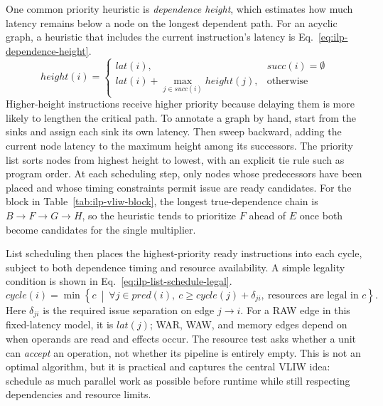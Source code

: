 One common priority heuristic is \textit{dependence height}, which estimates how much latency remains below a node on the longest dependent path.
For an acyclic graph, a heuristic that includes the current instruction's latency is Eq.~\eqref{eq:ilp-dependence-height}.
\begin{equation}\label{eq:ilp-dependence-height}
    height(i)=
    \begin{cases}
        lat(i), & succ(i)=\emptyset\\
        lat(i)+\max\limits_{j\in succ(i)} height(j), & \text{otherwise}
    \end{cases}
\end{equation}
Higher-height instructions receive higher priority because delaying them is more likely to lengthen the critical path.
To annotate a graph by hand, start from the sinks and assign each sink its own latency.
Then sweep backward, adding the current node latency to the maximum height among its successors.
The priority list sorts nodes from highest height to lowest, with an explicit tie rule such as program order.
At each scheduling step, only nodes whose predecessors have been placed and whose timing constraints permit issue are ready candidates.
For the block in Table~\ref{tab:ilp-vliw-block}, the longest true-dependence chain is $B\rightarrow F\rightarrow G\rightarrow H$, so the heuristic tends to prioritize $F$ ahead of $E$ once both become candidates for the single multiplier.

List scheduling then places the highest-priority ready instructions into each cycle, subject to both dependence timing and resource availability.
A simple legality condition is shown in Eq.~\eqref{eq:ilp-list-schedule-legal}.
\begin{equation}\label{eq:ilp-list-schedule-legal}
    cycle(i)=\min\!\left\{c\ \middle|\ \forall j\in pred(i),\ c\ge cycle(j)+\delta_{ji},\ \text{resources are legal in }c \right\}.
\end{equation}
Here $\delta_{ji}$ is the required issue separation on edge $j\rightarrow i$.
For a RAW edge in this fixed-latency model, it is $lat(j)$; WAR, WAW, and memory edges depend on when operands are read and effects occur.
The resource test asks whether a unit can \emph{accept} an operation, not whether its pipeline is entirely empty.
This is not an optimal algorithm, but it is practical and captures the central VLIW idea: schedule as much parallel work as possible before runtime while still respecting dependencies and resource limits.


